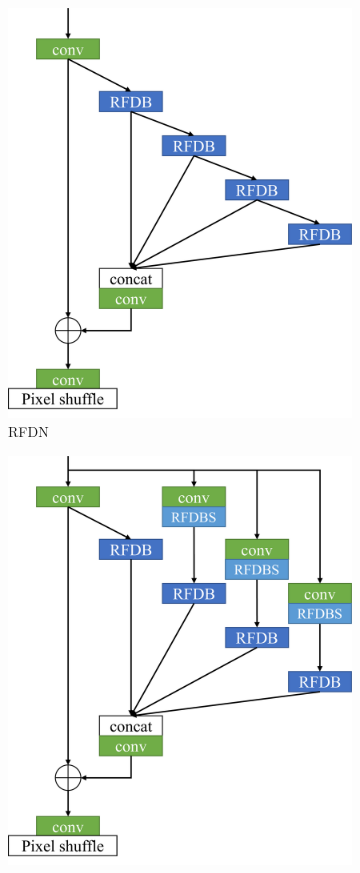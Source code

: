 \documentclass[10pt,twocolumn,letterpaper]{article}
\begin{document}
\begin{figure}
    \centering
    \begin{subfigure}[b]{0.49\linewidth}
		\centering
        \includegraphics[width=\textwidth]{../RFDN.pdf}
        \caption{RFDN}
        \label{fig:RFDN}
    \end{subfigure}
    \begin{subfigure}[b]{0.49\linewidth}
		\centering
        \includegraphics[width=\textwidth]{../Branching.pdf}

\end{subfigure}
\end{figure}
\end{document}
